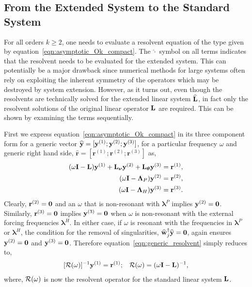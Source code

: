 \subsection{From the Extended System to the Standard System}
\label{sec:extended_to_standard}

For all orders $k\ge2$, one needs to evaluate a resolvent equation of the type given by equation~\eqref{eqn:asymptotic_Ok_compact}. The $\widehat{\cdot}$ symbol on all terms indicates that the resolvent needs to be evaluated for the extended system. This can potentially be a major drawback since numerical methods for large systems often rely on exploiting the inherent symmetry of the operators which may be destroyed by system extension. However, as it turns out, even though the resolvents are technically solved for the extended linear system $\mathbf{\widehat{L}}$, in fact only the resolvent solutions of the original linear operator $\mathbf{L}$ are required. This can be shown by examining the terms sequentially. 

First we express equation~\eqref{eqn:asymptotic_Ok_compact} in its three component form for a generic vector $\widehat{\mathbf{y}} = [\mathbf{y}^{(1)}; \mathbf{y}^{(2)}; \mathbf{y}^{(3)}]$, 
for a particular frequency $\omega$ and generic right hand side, $\widehat{\mathbf{r}} = [\mathbf{r}^{(1)}; \mathbf{r}^{(2)}; \mathbf{r}^{(3)}]$ as,
\begin{subequations}
	\label{eqn:generic_resolvent}
	\begin{align}
		(\omega\mathbf{I} - \mathbf{L})\mathbf{y}^{(1)} + \mathbf{L}_{\boldsymbol{\nu}}\mathbf{y}^{(2)} + \mathbf{L}_{\boldsymbol{\theta}}\mathbf{y}^{(3)} = \mathbf{r}^{(1)}, \\
		(\omega\mathbf{I} - \mathbf{\Lambda}_{P})\mathbf{y}^{(2)} = \mathbf{r}^{(2)}, \\
		(\omega\mathbf{I} - \mathbf{\Lambda}_{H})\mathbf{y}^{(3)} = \mathbf{r}^{(3)}.
	\end{align}
\end{subequations}
Clearly, $\mathbf{r}^{(2)}=\mathbf{0}$ and an $\omega$ that is non-resonant with $\boldsymbol{\lambda}^{P}$ implies $\mathbf{y}^{(2)} = \mathbf{0}$. Similarly, $\mathbf{r}^{(3)}=\mathbf{0}$ implies $\mathbf{y}^{(3)} = \mathbf{0}$ when $\omega$ is non-resonant with the external forcing frequencies $\boldsymbol{\lambda}^{H}$. In either case, if $\omega$ is resonant with the frequencies in $\boldsymbol{\lambda}^{P}$ or $\boldsymbol{\lambda}^{H}$, the condition for the removal of singularities, $\widehat{\mathbf{w}}^{\dagger}_{j}\widehat{\mathbf{y}} = \mathbf{0}$,  again ensures $\mathbf{y}^{(2)} = \mathbf{0}$ and $\mathbf{y}^{(3)} = \mathbf{0}$. Therefore equation~\eqref{eqn:generic_resolvent} simply reduces to,
\begin{align}
	\label{eqn:generic_resolvent_reduced}
	[\mathcal{R}(\omega)]^{-1}\mathbf{y}^{(1)} = \mathbf{r}^{(1)}; && \mathcal{R}({\omega}) = (\omega\mathbf{I} - \mathbf{L})^{-1}, 
\end{align}
where, $\mathcal{R}(\omega)$ is now the resolvent operator for the standard linear system $\mathbf{L}$.

